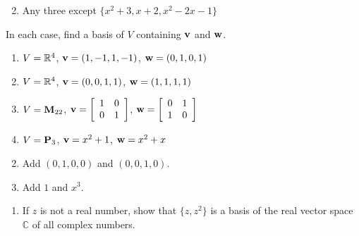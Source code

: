 \begin{multicols}{2}
\begin{ex}
\begin{enumerate}[label={\alph*.}]
\end{enumerate}
\begin{sol}
\begin{enumerate}[label={\alph*.}]
\setcounter{enumi}{1}
\item  Any three except $\{x^{2} + 3, x + 2, x^{2} - 2x - 1\}$

\end{enumerate}
\end{sol}
\end{ex}

\begin{ex}
In each case, find a basis of $V$ containing $\textbf{v}$ and $\textbf{w}$.

\begin{enumerate}[label={\alph*.}]
\item $V = \mathbb{R}^4$, $\textbf{v} = (1, -1, 1, -1)$, $\textbf{w} = (0, 1, 0, 1)$

\item $V = \mathbb{R}^4$, $\textbf{v} = (0, 0, 1, 1)$, $\textbf{w} = (1, 1, 1, 1)$

\item $V = \textbf{M}_{22}$, $\textbf{v} = 
\left[ \begin{array}{rr}
1 & 0 \\
0 & 1
\end{array} \right]$, $\textbf{w} = 
\left[ \begin{array}{rr}
0 & 1 \\
1 & 0
\end{array} \right]$

\item $V = \textbf{P}_{3}$, $\textbf{v} = x^{2} + 1$, $\textbf{w} = x^{2} + x$

\end{enumerate}
\begin{sol}
\begin{enumerate}[label={\alph*.}]
\setcounter{enumi}{1}
\item  Add $(0, 1, 0, 0)$ and $(0, 0, 1, 0)$.

\setcounter{enumi}{3}
\item  Add $1$ and $x^{3}$.

\end{enumerate}
\end{sol}
\end{ex}

\begin{ex}
\begin{enumerate}[label={\alph*.}]
\item If $z$ is not a real number, show that $\{z, z^{2}\}$ is a basis of the real vector space $\mathbb{C}$ of all complex numbers.


\end{enumerate}
\end{ex}
\end{multicols}
